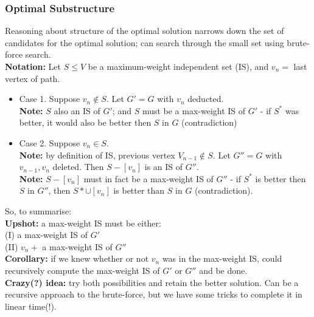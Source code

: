 \documentclass{scrartcl}
\begin{document}
\subsubsection{Optimal Substructure}
\label{sec:8-2}
Reasoning about structure of the optimal solution narrows down the set of
candidates for the optimal solution; can search through the small set using
brute-force search.\\
{\bf Notation: } Let $S \leq V$ be a maximum-weight independent set (IS), and
$v_n = $ last vertex of path.
\begin{itemize}
\item Case 1. Suppose $v_n \notin S$. Let $G' = G$ with $v_n$ deducted.\\
  {\bf Note: } $S$ also an IS of $G'$; and $S$ must be a max-weight IS of $G'$ -
  if $S^*$ was better, it would also be better then $S$ in $G$ (contradiction)
\item Case 2. Suppose $v_n \in S$. \\
  {\bf Note: } by definition of IS, previous vertex $V_{n-1} \notin S$. Let $G'' =  G$ with $v_{n-1}, v_n$ deleted. Then $S - [v_n]$ is an IS of $G''$.\\
  {\bf Note: } $S - [v_n]$ must in fact be a max-weight IS of $G''$ - if $S^*$ is better then $S$ in $G''$, then $S* \cup [v_n]$ is better than $S$ in $G$ (contradiction).
\end{itemize}
So, to summarise:\\
{\bf Upshot: } a max-weight IS must be either:\\
(I) a max-weight IS of $G'$\\
(II) $v_n + $ a max-weight IS of $G''$\\
{\bf Corollary: } if we knew whether or not $v_n$ was in the max-weight IS,
could
recursively compute the max-weight IS of $G'$ or $G''$ and be done.\\
{\bf Crazy(?) idea: } try both possibilities and retain the better solution. Can
be a recursive approach to the brute-force, but we have some tricks to complete
it in linear time(!).

\end{document}

